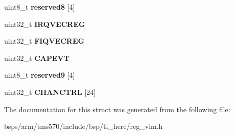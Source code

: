 \begin{DoxyCompactItemize}
uint8\+\_\+t {\bfseries reserved8} \mbox{[}4\mbox{]}
\item 
\mbox{\label{structtms570__vim__t_a94042b09445e8a9a8bebd579ba5bd0bd}} 
uint32\+\_\+t {\bfseries I\+R\+Q\+V\+E\+C\+R\+EG}
\item 
\mbox{\label{structtms570__vim__t_a53d7a1be396259c3e5ac55650cff24ae}} 
uint32\+\_\+t {\bfseries F\+I\+Q\+V\+E\+C\+R\+EG}
\item 
\mbox{\label{structtms570__vim__t_a251c8095fa4e06bb5e70d59da4c8168c}} 
uint32\+\_\+t {\bfseries C\+A\+P\+E\+VT}
\item 
\mbox{\label{structtms570__vim__t_a1dda614e843554884708c7bf736835cc}} 
uint8\+\_\+t {\bfseries reserved9} \mbox{[}4\mbox{]}
\item 
\mbox{\label{structtms570__vim__t_aa33c178c4a6e10278d0ec7e26d4aef19}} 
uint32\+\_\+t {\bfseries C\+H\+A\+N\+C\+T\+RL} \mbox{[}24\mbox{]}
\end{DoxyCompactItemize}


The documentation for this struct was generated from the following file\+:\begin{DoxyCompactItemize}
\item 
bsps/arm/tms570/include/bsp/ti\+\_\+herc/reg\+\_\+vim.\+h\end{DoxyCompactItemize}
